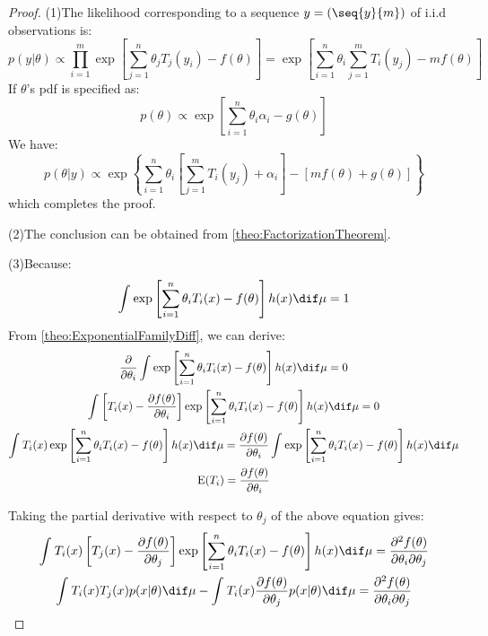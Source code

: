 \begin{proof}
	(1)The likelihood corresponding to a sequence $y = (\seq{y}{m})$ of i.i.d observations is:
	\begin{equation*}
		p(y|\theta)\propto\prod_{i=1}^{m}\exp\left[\sum_{j=1}^{n}\theta_jT_j(y_i)-f(\theta)\right]=\exp\left[\sum_{i=1}^{n}\theta_i\sum_{j=1}^{m}T_i(y_j)-mf(\theta)\right]
	\end{equation*}
	If $\theta$'s pdf is specified as:
	\begin{equation*}
		p(\theta)\propto\exp\left[\sum_{i=1}^{n}\theta_i\alpha_i-g(\theta)\right]
	\end{equation*}
	We have:
	\begin{equation*}
		p(\theta|y)\propto\exp\left\{\sum_{i=1}^{n}\theta_i\left[\sum_{j=1}^{m}T_i(y_j)+\alpha_i\right]-[mf(\theta)+g(\theta)]\right\}
	\end{equation*}
	which completes the proof.\par
	(2)The conclusion can be obtained from \cref{theo:FactorizationTheorem}.\par
	(3)Because:
	\begin{equation*}
		\int_{}^{}\exp\left[\sum_{i=1}^{n}\theta_iT_i(x)-f(\theta)\right]h(x)\dif\mu=1
	\end{equation*}
	From \cref{theo:ExponentialFamilyDiff}, we can derive:
	\begin{gather*}
		\frac{\partial}{\partial\theta_i}\int_{}^{}\exp\left[\sum_{i=1}^{n}\theta_iT_i(x)-f(\theta)\right]h(x)\dif\mu=0 \\
		\int_{}^{}\left[T_i(x)-\frac{\partial f(\theta)}{\partial\theta_i}\right]\exp\left[\sum_{i=1}^{n}\theta_iT_i(x)-f(\theta)\right]h(x)\dif\mu=0 \\
		\int_{}^{}T_i(x)\exp\left[\sum_{i=1}^{n}\theta_iT_i(x)-f(\theta)\right]h(x)\dif\mu=\frac{\partial f(\theta)}{\partial\theta_i}\int_{}^{}\exp\left[\sum_{i=1}^{n}\theta_iT_i(x)-f(\theta)\right]h(x)\dif\mu \\
		\operatorname{E}(T_i)=\frac{\partial f(\theta)}{\partial\theta_i}
	\end{gather*}\par
	Taking the partial derivative with respect to $\theta_j$ of the above equation gives:
	\begin{gather*}
		\int_{}^{}T_i(x)\left[T_j(x)-\frac{\partial f(\theta)}{\partial\theta_j}\right]\exp\left[\sum_{i=1}^{n}\theta_iT_i(x)-f(\theta)\right]h(x)\dif\mu=\frac{\partial^2 f(\theta)}{\partial\theta_i\partial\theta_j} \\
		\int_{}^{}T_i(x)T_j(x)p(x|\theta)\dif\mu-\int_{}^{}T_i(x)\frac{\partial f(\theta)}{\partial\theta_j}p(x|\theta)\dif\mu=\frac{\partial^2 f(\theta)}{\partial\theta_i\partial\theta_j} \\

\end{gather*}
\end{proof}

